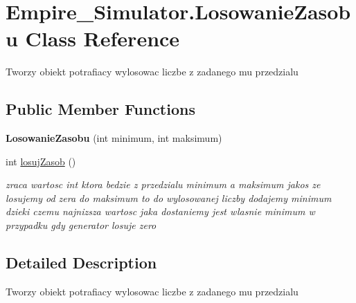 \hypertarget{class_empire___simulator_1_1_losowanie_zasobu}{\section{Empire\+\_\+\+Simulator.\+Losowanie\+Zasobu Class Reference}
\label{class_empire___simulator_1_1_losowanie_zasobu}
}


Tworzy obiekt potrafiacy wylosowac liczbe z zadanego mu przedzialu  


\subsection*{Public Member Functions}
\begin{DoxyCompactItemize}
\item 
\hypertarget{class_empire___simulator_1_1_losowanie_zasobu_aaebf0e1c3819eefae2a01c36c7bdd480}{{\bfseries Losowanie\+Zasobu} (int minimum, int maksimum)}\label{class_empire___simulator_1_1_losowanie_zasobu_aaebf0e1c3819eefae2a01c36c7bdd480}

\item 
int \hyperlink{class_empire___simulator_1_1_losowanie_zasobu_afd8b2d6873100e8e4ffed05e8e837a62}{losuj\+Zasob} ()
\begin{DoxyCompactList}\small\item\em zraca wartosc int ktora bedzie z przedzialu minimum a maksimum jakos ze losujemy od zera do maksimum to do wylosowanej liczby dodajemy minimum dzieki czemu najnizsza wartosc jaka dostaniemy jest wlasnie minimum w przypadku gdy generator losuje zero \end{DoxyCompactList}\end{DoxyCompactItemize}


\subsection{Detailed Description}
Tworzy obiekt potrafiacy wylosowac liczbe z zadanego mu przedzialu 




